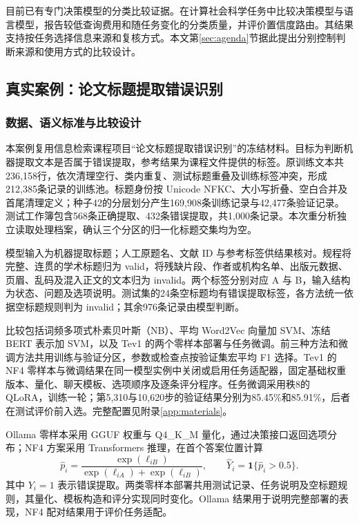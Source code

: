 \documentclass[UTF8,a4paper,zihao=-4,fontset=fandol]{ctexart}
\newcommand{\ind}{\mathbf 1}
\begin{document}
目前已有专门决策模型的分类比较证据。\citet{ibrahim2026}在计算社会科学任务中比较决策模型与语言模型，报告较低查询费用和随任务变化的分类质量，并评价置信度路由。其结果支持按任务选择信息来源和复核方式。本文第\ref{sec:agenda}节据此提出分别控制判断来源和使用方式的比较设计。

\subsection{真实案例：论文标题提取错误识别}\label{sec:title-case}

\subsubsection{数据、语义标准与比较设计}

本案例复用信息检索课程项目“论文标题提取错误识别”的冻结材料\citep{title-case}。目标为判断机器提取文本是否属于错误提取，参考结果为课程文件提供的标签。原训练文本共236,158行，依次清理空行、类内重复、测试标题重叠及训练标签冲突，形成212,385条记录的训练池。标题身份按 Unicode NFKC、大小写折叠、空白合并及首尾清理定义；种子42的分层划分产生169,908条训练记录与42,477条验证记录。测试工作簿包含568条正确提取、432条错误提取，共1,000条记录。本次重分析独立读取处理档案，确认三个分区的归一化标题交集均为空。

模型输入为机器提取标题；人工原题名、文献 ID 与参考标签供结果核对。规程将完整、连贯的学术标题归为 valid，将残缺片段、作者或机构名单、出版元数据、页眉、乱码及混入正文的文本归为 invalid。两个标签分别对应 A 与 B，输入结构为状态、问题及选项说明。测试集的24条空标题均有错误提取标签，各方法统一依据空标题规则判为 invalid；其余976条记录由模型判断。

比较包括词频多项式朴素贝叶斯（NB）、平均 Word2Vec 向量加 SVM、冻结 BERT 表示加 SVM，以及 Tev1 的两个零样本部署与任务微调。前三种方法和微调方法共用训练与验证分区，参数或检查点按验证集宏平均 F1 选择。Tev1 的 NF4 零样本与微调结果在同一模型实例中关闭或启用任务适配器，固定基础权重版本、量化、聊天模板、选项顺序及逐条评分程序。任务微调采用秩8的 QLoRA，训练一轮；第5,310与10,620步的验证结果分别为85.45\%和85.91\%，后者在测试评价前入选。完整配置见附录\ref{app:materials}。

Ollama 零样本采用 GGUF 权重与 Q4\_K\_M 量化，通过决策接口返回选项分布；NF4 方案采用 Transformers 推理，在首个答案位置计算
\begin{equation}
 \widehat p_i=\frac{\exp(\ell_{iB})}{\exp(\ell_{iA})+\exp(\ell_{iB})},\qquad
 \widehat Y_i=\ind\{\widehat p_i>0.5\}.
 \label{eq:title-probability}
\end{equation}
其中 $Y_i=1$ 表示错误提取。两类零样本部署共用测试记录、任务说明及空标题规则，其量化、模板构造和评分实现同时变化。Ollama 结果用于说明完整部署的表现，NF4 配对结果用于评价任务适配。
\end{document}
